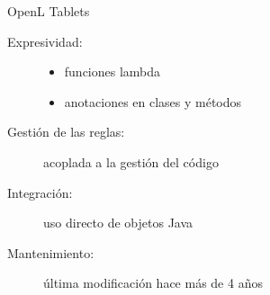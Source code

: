 \documentclass[10pt]{beamer}
\begin{document}
\begin{frame}{OpenL Tablets}
    \begin{description}
        \item [Expresividad:]
            \begin{itemize}
                \item funciones lambda
                \item anotaciones en clases y métodos
            \end{itemize}
        \item [Gestión de las reglas:] acoplada a la gestión del código
        \item [Integración:] uso directo de objetos Java
        \item [Mantenimiento:] última modificación hace más de 4 años
    \end{description}
\end{frame}
\begin{comment}

\end{comment}





\end{document}
